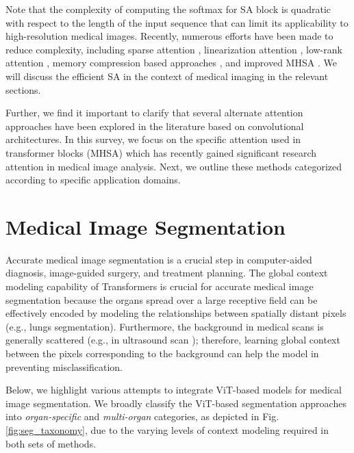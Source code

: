 \documentclass[10pt,journal,compsoc]{IEEEtran}
\begin{document}
Note that the complexity of computing the softmax for SA block is quadratic with respect to the length of the input sequence that can limit its applicability to high-resolution medical images. Recently, numerous efforts have been made to reduce complexity, including sparse attention \cite{rao2021dynamicvit}, linearization attention \cite{katharopoulos2020transformers}, low-rank attention \cite{xiong2021nystr}, memory compression based approaches \cite{choromanski2020rethinking}, and improved MHSA \cite{shazeer2020talking}. We will discuss the efficient SA in the context of medical imaging in the relevant sections.

Further, we find it important to clarify that several alternate attention approaches \cite{jin2020ra,schlemper2019attention,maji2022attention,guo2021attention} have been explored in the literature based on convolutional architectures. In this survey, we focus on the specific attention used in transformer blocks (MHSA) which has recently gained significant research attention in medical image analysis. Next, we outline these methods categorized according to specific application domains.

\section{Medical Image Segmentation} \label{sec:seg}

Accurate medical image segmentation is a crucial step in computer-aided diagnosis, image-guided surgery, and treatment planning. 
The global context modeling capability of Transformers is crucial for accurate medical image segmentation because the organs spread over a large receptive field can be effectively encoded by modeling the relationships between spatially distant pixels (e.g., lungs segmentation). Furthermore,  the background in medical scans is generally scattered (e.g., in ultrasound scan \cite{avola2021ultrasound}); therefore, learning global context between the pixels corresponding to the background can help the model in preventing misclassification.

Below, we highlight various attempts to integrate ViT-based models for medical image segmentation. We broadly classify the ViT-based segmentation approaches into \textit{organ-specific} and \textit{multi-organ} categories, as depicted in Fig. \ref{fig:seg_taxonomy}, due to the varying levels of context modeling required in both sets of methods. 
\end{document}
